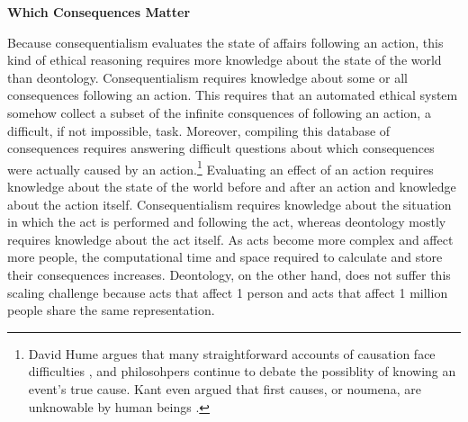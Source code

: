 \begin{isabellebody}
%
\begin{isamarkuptext}%
\noindent \textbf{Which Consequences Matter}%
\end{isamarkuptext}\isamarkuptrue%
%
\begin{isamarkuptext}%
Because consequentialism evaluates the state of affairs following an action, this kind of ethical 
reasoning requires more knowledge about the state of the world than deontology. Consequentialism
requires knowledge about some or all consequences following an action. This requires that an automated 
ethical system somehow collect a subset of the infinite consquences of following an action, a difficult, 
if not impossible, task. Moreover, compiling this database of consequences requires 
answering difficult questions about which consequences were actually caused by an action.\footnote
{David Hume argues that many straightforward accounts of causation face difficulties \citep{hume}, 
and philosohpers continue to debate the possiblity of knowing an event's true cause. Kant even argued
that first causes, or noumena, are unknowable by human beings \citep{kantnoumena}.}
Evaluating an effect of an action requires knowledge about the 
state of the world before and after an action and knowledge about the action itself. Consequentialism requires 
knowledge about the situation in which the act is performed and following the act, whereas deontology mostly requires 
knowledge about the act itself. As acts become
more complex and affect more people, the computational time and space required to calculate and store
their consequences increases. Deontology, on the other hand, does not suffer this scaling
challenge because acts that affect 1 person and acts that affect 1 million people share the same
representation.


\end{isamarkuptext}
\end{isabellebody}
